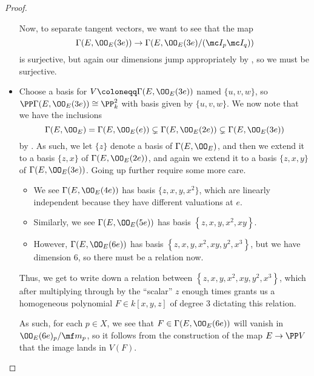 \documentclass[../notes.tex]{subfiles}
\begin{document}
\begin{proof}
\begin{itemize}
		Now, to separate tangent vectors, we want to see that the map
		\[\Gamma(E,\OO_E(3e))\to\Gamma(E,\OO_E(3e)/(\mc I_p\mc I_q))\]
		is surjective, but again our dimensions jump appropriately by , so we must be surjective.

		\item Choose a basis for $V\coloneqq\Gamma(E,\OO_E(3e))$ named $\{u,v,w\}$, so $\PP\Gamma(E,\OO_E(3e))\cong\PP^2_k$ with basis given by $\{u,v,w\}$. We now note that we have the inclusions
		\[\Gamma(E,\OO_E)=\Gamma(E,\OO_E(e))\subsetneq\Gamma(E,\OO_E(2e))\subsetneq\Gamma(E,\OO_E(3e))\]
		by . As such, we let $\{z\}$ denote a basis of $\Gamma(E,\OO_E)$, and then we extend it to a basis $\{z,x\}$ of $\Gamma(E,\OO_E(2e))$, and again we extend it to a basis $\{z,x,y\}$ of $\Gamma(E,\OO_E(3e))$. Going up further require some more care.
		\begin{itemize}
			\item We see $\Gamma(E,\OO_E(4e))$ has basis $\{z,x,y,x^2\}$, which are linearly independent because they have different valuations at $e$.
			\item Similarly, we see $\Gamma(E,\OO_E(5e))$ has basis $\left\{z,x,y,x^2,xy\right\}$.
			\item However, $\Gamma(E,\OO_E(6e))$ has basis $\left\{z,x,y,x^2,xy,y^2,x^3\right\}$, but we have dimension $6$, so there must be a relation now.
		\end{itemize}
		Thus, we get to write down a relation between $\left\{z,x,y,x^2,xy,y^2,x^3\right\}$, which after multiplying through by the ``scalar'' $z$ enough times grants us a homogeneous polynomial $F\in k[x,y,z]$ of degree $3$ dictating this relation.

		As such, for each $p\in X$, we see that $F\in\Gamma(E,\OO_E(6e))$ will vanish in $\OO_E(6e)_p/\mf m_p$, so it follows from the construction of the map $E\to\PP V$ that the image lands in $V(F)$.
		\qedhere
	\end{itemize}
\end{proof}
\end{document}
